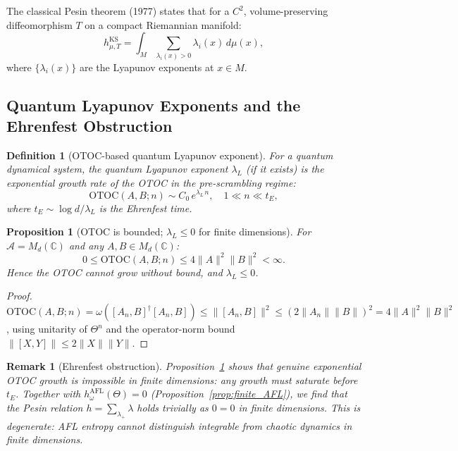 \documentclass[12pt,a4paper]{article}
\newtheorem{proposition}[theorem]{Proposition}
\newtheorem{definition}[theorem]{Definition}
\newtheorem{remark}[theorem]{Remark}
\newcommand{\A}{\mathcal{A}}
\begin{document}
The classical Pesin theorem (1977) states that for a $C^2$, volume-preserving
diffeomorphism $T$ on a compact Riemannian manifold:
\begin{equation}\label{eq:pesin_classical}
  h_{\mu,T}^{\mathrm{KS}} = \int_M \sum_{\lambda_i(x)>0}\lambda_i(x)\,d\mu(x),
\end{equation}
where $\{\lambda_i(x)\}$ are the Lyapunov exponents at $x\in M$.

\subsection{Quantum Lyapunov Exponents and the Ehrenfest Obstruction}

\begin{definition}[OTOC-based quantum Lyapunov exponent]
\label{def:qle}
For a quantum dynamical system, the quantum Lyapunov exponent $\lambda_L$ (if it
exists) is the exponential growth rate of the OTOC in the \emph{pre-scrambling regime}:
\[
  \mathrm{OTOC}(A,B;n) \sim C_0\,e^{\lambda_L\,n}, \quad 1\ll n\ll t_E,
\]
where $t_E\sim\log d/\lambda_L$ is the Ehrenfest time.
\end{definition}

\begin{proposition}[OTOC is bounded; $\lambda_L\leq 0$ for finite dimensions]
\label{prop:otoc_bound}
For $\A=M_d(\mathbb{C})$ and any $A,B\in M_d(\mathbb{C})$:
\[
  0 \leq \mathrm{OTOC}(A,B;n) \leq 4\|A\|^2\|B\|^2 < \infty.
\]
Hence the OTOC cannot grow without bound, and $\lambda_L\leq 0$.
\end{proposition}

\begin{proof}
$\mathrm{OTOC}(A,B;n)=\omega([A_n,B]^\dagger[A_n,B])\leq\|[A_n,B]\|^2
\leq(2\|A_n\|\|B\|)^2=4\|A\|^2\|B\|^2$, using unitarity of $\Theta^n$ and the
operator-norm bound $\|[X,Y]\|\leq 2\|X\|\|Y\|$.
\end{proof}

\begin{remark}[Ehrenfest obstruction]
Proposition~\ref{prop:otoc_bound} shows that genuine exponential OTOC growth is
impossible in finite dimensions: any growth must saturate before $t_E$.  Together
with $h_\omega^{\mathrm{AFL}}(\Theta)=0$ (Proposition~\ref{prop:finite_AFL}), we
find that the Pesin relation $h=\sum_{\lambda_+}\lambda$ holds trivially as $0=0$
in finite dimensions.  This is degenerate: AFL entropy cannot distinguish integrable
from chaotic dynamics in finite dimensions.
\end{remark}
\end{document}
